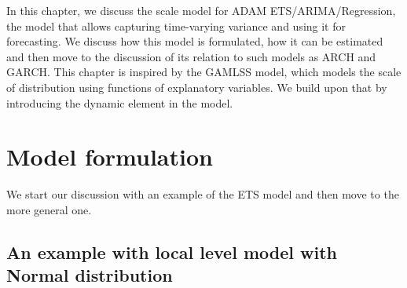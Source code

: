 \documentclass[]{book}
\theoremstyle{definition}
\theoremstyle{definition}
\theoremstyle{definition}
\theoremstyle{definition}
\theoremstyle{remark}
\begin{document}
In this chapter, we discuss the scale model for ADAM ETS/ARIMA/Regression, the model that allows capturing time-varying variance and using it for forecasting. We discuss how this model is formulated, how it can be estimated and then move to the discussion of its relation to such models as ARCH and GARCH. This chapter is inspired by the GAMLSS model, which models the scale of distribution using functions of explanatory variables. We build upon that by introducing the dynamic element in the model.

\hypertarget{ADAMscaleModelFormulation}{%
\section{Model formulation}\label{ADAMscaleModelFormulation}}

We start our discussion with an example of the ETS model and then move to the more general one.

\hypertarget{an-example-with-local-level-model-with-normal-distribution}{%
\subsection{An example with local level model with Normal distribution}\label{an-example-with-local-level-model-with-normal-distribution}}
\end{document}

